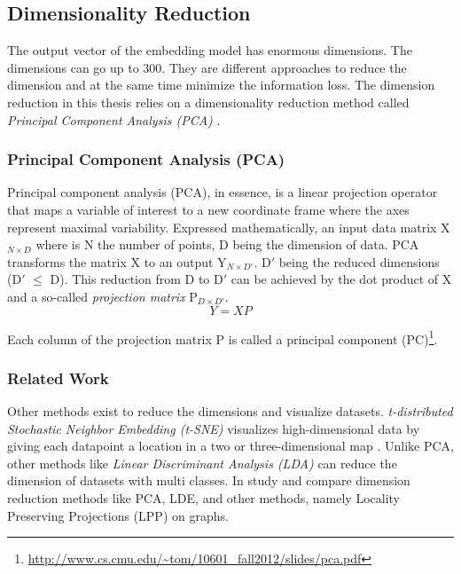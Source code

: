 \subsection{Dimensionality Reduction}
\label{subsec:dimension-reduction}
The output vector of the embedding model has enormous dimensions. The dimensions can go up to 300. They are different approaches to reduce the dimension and at the same time minimize the information loss. The dimension reduction in this thesis relies on a dimensionality reduction method called \emph{Principal Component Analysis (PCA)} \cite{woldPrincipalComponentAnalysis1987}.

\subsubsection{Principal Component Analysis (PCA)}
\label{subsubsec:pca}
Principal component analysis (PCA), in essence, is a linear projection operator that maps a variable of interest to a new coordinate frame where the axes represent maximal variability. Expressed mathematically, an input data matrix X$_{N \times D}$ where is N the number of points, D being the dimension of data. PCA transforms the matrix X to an output Y$_{N \times D\prime}$. D$\prime$ being the reduced dimensions (D$\prime$ $\leq$ D). This reduction from D to D$\prime$ can be achieved by the dot product of X and a so-called \emph{projection matrix} P$_{D \times D\prime}$.
    \begin{equation}
        \label{PCA}
        Y = XP
    \end{equation}

\noindent Each column of the projection matrix P is called a principal component (PC)\footnote{\url{http://www.cs.cmu.edu/~tom/10601_fall2012/slides/pca.pdf}}. 


\subsubsection{Related Work}
\label{subsubsec:dimension-reduction-related-work}
Other methods exist to reduce the dimensions and visualize datasets. \emph{t-distributed Stochastic Neighbor Embedding (t-SNE)} visualizes high-dimensional data by giving each datapoint a location in a two or three-dimensional map \cite{vandermaaten08}. Unlike PCA, other methods like \emph{Linear Discriminant Analysis (LDA)} \cite{martinezPCALDA2001} can reduce the dimension of datasets with multi classes. In \cite{yanGraphEmbeddingExtensions2007} study and compare dimension reduction methods like PCA, LDE, and other methods, namely Locality Preserving Projections (LPP) on graphs.
